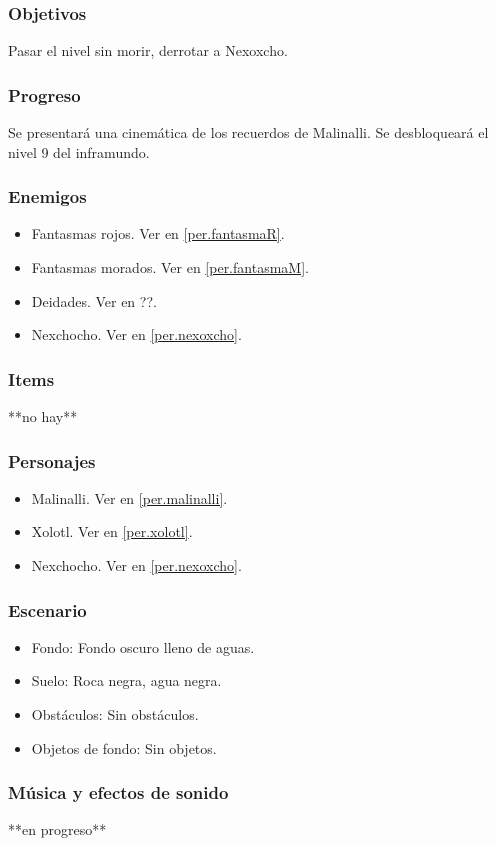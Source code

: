 \documentclass[11pt,letterpaper]{article}
\begin{document}
	\subsubsection{Objetivos}
	Pasar el nivel  sin morir, derrotar a Nexoxcho.
	\subsubsection{Progreso}
	Se presentará una cinemática de los recuerdos de Malinalli. Se desbloqueará el nivel 9 del inframundo. 
	\subsubsection{Enemigos}
	\begin{itemize}
		\item Fantasmas rojos. Ver en \ref{per.fantasmaR}.
		\item Fantasmas morados. Ver en \ref{per.fantasmaM}.
		\item Deidades. Ver en ??.
		\item Nexchocho. Ver en \ref{per.nexoxcho}.
	\end{itemize}
	\subsubsection{Items}
	**no hay**
	\subsubsection{Personajes}
	\begin{itemize}
		\item Malinalli. Ver en \ref{per.malinalli}.
		\item Xolotl. Ver en \ref{per.xolotl}.
		\item Nexchocho. Ver en \ref{per.nexoxcho}.
	\end{itemize}
	\subsubsection{Escenario}
\begin{itemize} 
	\item Fondo: Fondo oscuro lleno de aguas.
	\item Suelo: Roca negra, agua negra.
	\item Obstáculos: Sin obstáculos.
	\item Objetos de fondo: Sin objetos.
\end{itemize}	
	\subsubsection{Música y efectos de sonido}
	**en progreso**
\end{document}
